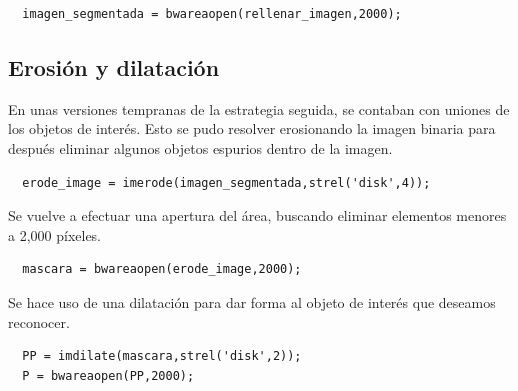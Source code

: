 \documentclass[a4paper, 11pt]{article}
\begin{document}
\begin{lstlisting}[style=Matlab-editor, caption=Apertura de 2000px]
  %QUITAR ELEMENTOS MENORES A 2000px
  imagen_segmentada = bwareaopen(rellenar_imagen,2000);
\end{lstlisting}






\subsection{Erosión y dilatación}

En unas versiones tempranas de la estrategia seguida, se contaban con uniones de los objetos de interés. Esto se pudo resolver erosionando la imagen binaria para después eliminar algunos objetos espurios dentro de la imagen.

\begin{lstlisting}[style=Matlab-editor, caption=Erosión con elemento estructurante disco 4px]
  %EROSIONAR PARA LIMPIAR MAS LA IMAGEN
  erode_image = imerode(imagen_segmentada,strel('disk',4));
\end{lstlisting}

Se vuelve a efectuar una apertura del área, buscando eliminar elementos menores a 2,000 píxeles.

\begin{lstlisting}[style=Matlab-editor, caption=Apertura de 2000px]
  %QUITAR ELEMENTOS MENORES A 2000px
  mascara = bwareaopen(erode_image,2000);
\end{lstlisting}

Se hace uso de una dilatación para dar forma al objeto de interés que deseamos reconocer.

\begin{lstlisting}[style=Matlab-editor, caption=Dilatación con elemento estructurante disco 2px]
  %DILATAR PARA PRESERVAR LA FORMA DEL OBJETO
  PP = imdilate(mascara,strel('disk',2));
  P = bwareaopen(PP,2000);
\end{lstlisting}
\end{document}
